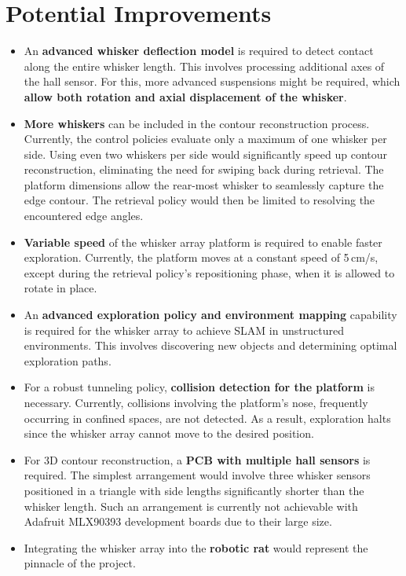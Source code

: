 \section{Potential Improvements}
\begin{itemize}
    \item An \textbf{advanced whisker deflection model} is required to detect contact along the entire whisker length.
    This involves processing additional axes of the hall sensor.
    For this, more advanced suspensions might be required, which \textbf{allow both rotation and axial displacement of the whisker}.

    \item \textbf{More whiskers} can be included in the contour reconstruction process.
    Currently, the control policies evaluate only a maximum of one whisker per side.
    Using even two whiskers per side would significantly speed up contour reconstruction, eliminating the need for swiping back during retrieval.
    The platform dimensions allow the rear-most whisker to seamlessly capture the edge contour.
    The retrieval policy would then be limited to resolving the encountered edge angles.

    \item \textbf{Variable speed} of the whisker array platform is required to enable faster exploration.
    Currently, the platform moves at a constant speed of 5\,cm/s, except during the retrieval policy’s repositioning phase, when it is allowed to rotate in place.

    \item An \textbf{advanced exploration policy and environment mapping} capability is required for the whisker array to achieve SLAM in unstructured environments.
    This involves discovering new objects and determining optimal exploration paths.

    \item For a robust tunneling policy, \textbf{collision detection for the platform} is necessary.
    Currently, collisions involving the platform’s nose, frequently occurring in confined spaces, are not detected.
    As a result, exploration halts since the whisker array cannot move to the desired position.

    \item For 3D contour reconstruction, a \textbf{PCB with multiple hall sensors} is required.
    The simplest arrangement would involve three whisker sensors positioned in a triangle with side lengths significantly shorter than the whisker length.
    Such an arrangement is currently not achievable with Adafruit MLX90393 development boards due to their large size.

    \item Integrating the whisker array into the \textbf{robotic rat} would represent the pinnacle of the project.
\end{itemize}
